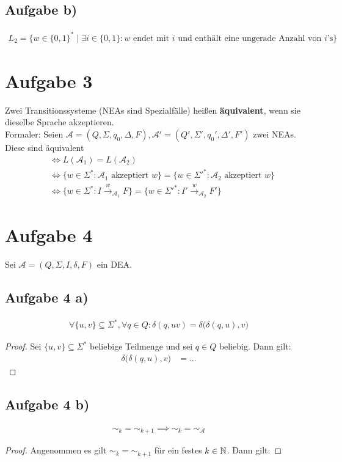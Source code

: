 \documentclass[12pt,a4paper]{article}
\newcommand{\A}{\mathcal{A}}
\begin{document}

\subsection*{Aufgabe b)}
\begin{align*}
L_2=\big\lbrace w\in\lbrace0,1\rbrace^\ast\mid\exists i\in\lbrace0,1\rbrace:w\text{ endet mit $i$ und enthält eine ungerade Anzahl von $i$'s}\big\rbrace
\end{align*}

\section*{Aufgabe 3}
Zwei Transitionssysteme (NEAs sind Spezialfälle) heißen \textbf{äquivalent}, wenn sie dieselbe Sprache akzeptieren.\\
Formaler: Seien $\A=(Q,\Sigma,q_0,\Delta,F),\A'=(Q',\Sigma',q_0',\Delta',F')$ zwei NEAs. Diese sind äquivalent
\begin{align*}
&\Longleftrightarrow L(\A_1)=L(\A_2)\\
&\Longleftrightarrow \big\lbrace w\in\Sigma^\ast:\A_1\text{ akzeptiert }w\big\rbrace
=\big\lbrace w\in\Sigma'^\ast:\A_2\text{ akzeptiert }w\big\rbrace\\
&\Longleftrightarrow\big\lbrace w\in\Sigma^\ast:I\stackrel{w}{\longrightarrow}_{\A_1} F\big\rbrace=
\big\lbrace w\in\Sigma'^\ast:I'\stackrel{w}{\longrightarrow}_{\A_2} F'\big\rbrace
\end{align*}

\section*{Aufgabe 4}
Sei $\A=(Q,\Sigma,I,\delta,F)$ ein DEA.

\subsection*{Aufgabe 4 a)}
\begin{align*}
\forall\lbrace u,v\rbrace\subseteq\Sigma^\ast,\forall q\in Q:\delta(q,uv)=\delta\big(\delta(q,u),v\big)
\end{align*}
\begin{proof}
Sei $\lbrace u,v\rbrace\subseteq\Sigma^\ast$ beliebige Teilmenge und sei $q\in Q$ beliebig. Dann gilt:
\begin{align*}
\delta\big(\delta(q,u),v\big)
&=...
\end{align*}
\end{proof}

\subsection*{Aufgabe 4 b)}
\begin{align*}
\sim_k=\sim_{k+1}\implies\sim_k=\sim_\A
\end{align*}
\begin{proof}
Angenommen es gilt $\sim_k=\sim_{k+1}$ für ein festes $k\in\mathbb{N}$. Dann gilt:
\end{proof}
\end{document}
